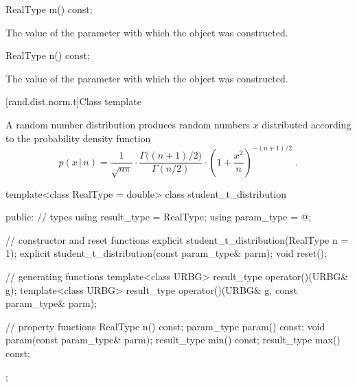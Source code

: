 %
\begin{itemdecl}
RealType m() const;
\end{itemdecl}

\begin{itemdescr}
\pnum\returns The value of the  parameter
 with which the object was constructed.
\end{itemdescr}

%
\begin{itemdecl}
RealType n() const;
\end{itemdecl}

\begin{itemdescr}
\pnum\returns The value of the  parameter
 with which the object was constructed.
\end{itemdescr}


[rand.dist.norm.t]{Class template }%
%
%

\pnum
A  random number distribution
produces random numbers $x$
distributed according to
the probability density function%
%
%
\[ p(x\,|\,n) = \frac{1}{\sqrt{n \pi}}
     \cdot \frac{\Gamma\big((n+1)/2\big)}{\Gamma(n/2)}
     \cdot \left(1 + \frac{x^2}{n} \right)^{-(n+1)/2}
     \text{ .} \]

%
\begin{codeblock}
template<class RealType = double>
  class student_t_distribution {
  public:
    // types
    using result_type = RealType;
    using param_type  = @\unspec@;

    // constructor and reset functions
    explicit student_t_distribution(RealType n = 1);
    explicit student_t_distribution(const param_type& parm);
    void reset();

    // generating functions
    template<class URBG>
      result_type operator()(URBG& g);
    template<class URBG>
      result_type operator()(URBG& g, const param_type& parm);

    // property functions
    RealType n() const;
    param_type param() const;
    void param(const param_type& parm);
    result_type min() const;
    result_type max() const;
  };
\end{codeblock}


